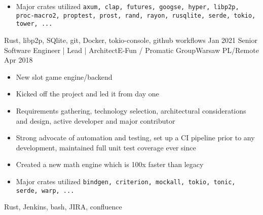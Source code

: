 \begin{experiences}
{\begin{itemize}
\begin{itemize}
                          \item SQlite based storage
                          \item JSON RPC server
                          \item Derive proc macros for easier P2P DTO generation
                          \item Patricia-Merkle-Tries traversal for proof generation
                          \item randomized fake block data generation for sync testing
                          \item RPC load tests
                        \end{itemize}
                        \item Major crates utilized \newline
                           \texttt{axum, clap, futures, googse, hyper, libp2p, proc-macro2, proptest, prost, rand, rayon, rusqlite, serde, tokio, tower, ...}
                      \end{itemize}
                    }
                    {Rust, libp2p, SQlite, git, Docker, tokio-console, github workflows}
  \emptySeparator
  \experience
    {Jan 2021} {Senior Software Engineer | Lead | Architect}{E-Fun / Promatic Group}{Warsaw PL/Remote}
    {Apr 2018}    {
                      \begin{itemize}
                        \item New slot game engine/backend
                        \item Kicked off the project and led it from day one
                        \item Requirements gathering, technology selection, architectural considerations and design, active developer and major contributor
                        \item Strong advocate of automation and testing, set up a CI pipeline prior to any development, maintained full unit test coverage ever since
                        \item Created a new math engine which is 100x faster than legacy
                        \item Major crates utilized \newline
                        \texttt{bindgen, criterion, mockall, tokio, tonic, serde, warp, ...}
                      \end{itemize}
                    }
                    {Rust, Jenkins, bash, JIRA, confluence}
  \emptySeparator
  \experience

\end{experiences}
